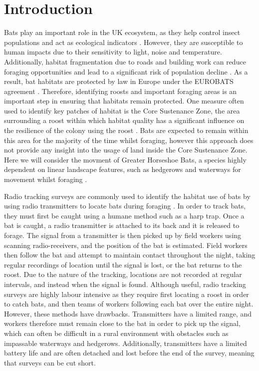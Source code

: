 \chapter{Introduction} \label{chap:intro}

  Bats play an important role in the UK ecosystem, as they help control insect
  populations \cite{Kunz2011} and act as ecological indicators \cite{Jones2009}.
  However, they are susceptible to human impacts due to their sensitivity to
  light, noise and temperature. Additionally, habitat fragmentation due to roads
  and building work can reduce foraging opportunities and lead to a significant
  risk of population decline \cite{rossiter2000genetic}.
 As a result, bat habitats are protected by law in
Europe under the EUROBATS agreement \cite{Eurobats}. Therefore, identifying
roosts and important foraging areas is an important step in ensuring that
habitats remain protected. One measure often used to identify key patches of
habitat is the Core Sustenance Zone, the area surrounding a roost within which
habitat quality has a significant influence on the resilience of the colony
using the roost \cite{CSZ}. Bats are expected to remain within this area for
the majority of the time whilst foraging, however this approach does not provide
any insight into the usage of land inside the Core Sustenance Zone. Here we will consider the movment of Greater Horseshoe Bats, a species highly dependent on linear
landscape features, such as hedgerows and waterways for movement whilst foraging \cite{froidevaux2017factors, duverge1994greater}.

  Radio tracking surveys are commonly used to identify the habitat use of bats
   by using radio transmitters to
 locate bats during foraging
   \cite{Bontadina2002,
Encarnacao2005}.
  In order to
 track bats, they must first be caught using a
humane method such as a harp trap.
 Once a bat is caught, a radio
   transmitter
is attached to its back and it is
 released to forage. The
  signal from a
transmitter is then picked up by field
 workers using scanning radio-receivers, and the position of the bat is
 estimated. Field workers then follow the bat and attempt to maintain contact
 throughout the night, taking regular recordings of location until the signal is
 lost, or the bat returns to
the roost. Due to the nature of the tracking,
 locations are not recorded at regular intervals, and instead when the signal is
 found. Although useful, radio
tracking surveys are highly labour intensive as
 they require first locating a
roost in order to catch bats, and then teams of
 workers following each bat over the entire night. However, these methods have drawbacks. Transmitters have a limited
 range, and workers therefore
must remain close to the bat in order to pick up
 the signal, which can often be
difficult in a rural environment with obstacles
 such as impassable waterways
and hedgerows. Additionally,
  transmitters have a
 limited battery life and are
often detached and lost before the end of the
 survey, meaning that surveys can
be cut short.

